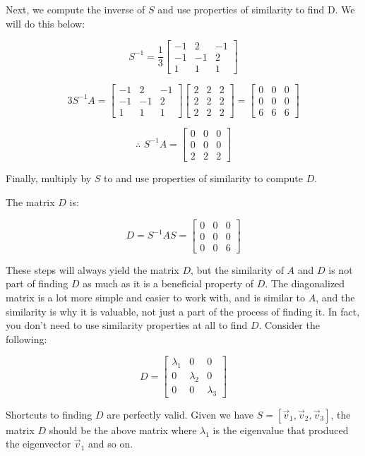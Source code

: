 \documentclass[11pt]{article}
\begin{document}
Next, we compute the inverse of $S$ and use properties of similarity to find D. We will do this below:

$$S^{-1}=\frac{1}{3}\begin{bmatrix}-1 & 2 & -1\\-1 & -1 & 2\\1 & 1 & 1\end{bmatrix}$$

$$3S^{-1}A=\begin{bmatrix}-1 & 2 & -1\\-1 & -1 & 2\\1 & 1 & 1\end{bmatrix}\begin{bmatrix}2 & 2 & 2\\2 & 2 & 2\\2 & 2 & 2\end{bmatrix}=\begin{bmatrix}0 & 0 & 0\\0 & 0 & 0\\6 & 6 & 6\end{bmatrix}$$

$$\therefore\,\, S^{-1}A=\begin{bmatrix}0 & 0 & 0\\0 & 0 & 0\\2 & 2 & 2\end{bmatrix}$$

Finally, multiply by $S$ to and use properties of similarity to compute $D$.

\newpage
The matrix $D$ is:

$$D=S^{-1}AS=\begin{bmatrix}0 & 0 & 0\\0 & 0 & 0\\0 & 0 & 6\end{bmatrix}$$

These steps will always yield the matrix $D$, but the similarity of $A$ and $D$ is not part of finding $D$ as much as it is a beneficial property of $D$. The diagonalized matrix is a lot more simple and easier to work with, and is similar to $A$, and the similarity is why it is valuable, not just a part of the process of finding it. In fact, you don't need to use similarity properties at all to find $D$. Consider the following:

$$D=\begin{bmatrix}
\lambda_1 & 0 & 0\\
0 & \lambda_2 & 0\\
0 & 0 & \lambda_3
\end{bmatrix}$$

Shortcuts to finding $D$ are perfectly valid. Given we have $S=[\vec{v}_1,\vec{v}_2,\vec{v}_3]$, the matrix $D$ should be the above matrix where $\lambda_1$ is the eigenvalue that produced the eigenvector $\vec{v}_1$ and so on.
\end{document}
